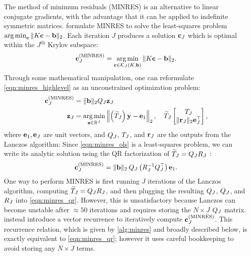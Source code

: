 The method of minimum residuals (MINRES) \cite{paige1975solution} is an alternative to linear conjugate gradients, with the advantage that it can be applied to indefinite symmetric matrices.
\citet{paige1975solution} formulate MINRES to solve the least-squares problem $\operatorname*{arg\,min}_{\mathbf{c}} \Vert K \mathbf{c} - \mathbf{b} \Vert_2$.
Each iteration $J$ produces a solution $\mathbf{c}_J$ which is optimal within the $J^\text{th}$ Krylov subspace:
%
\begin{equation}
	\mathbf{c}_J^{(\text{MINRES})} = \operatorname*{arg\,min}_{\mathbf{c} \in \mathcal{K}_J(K, \mathbf{b})} \Vert K \mathbf{c} - \mathbf{b} \Vert_2.
	\label{eqn:minres_highlevel}
\end{equation}
%
Through some mathematical manipulation, one can reformulate \cref{eqn:minres_highlevel} as an unconstrained optimization problem:
%
\begin{align}
  \mathbf{c}_J^{(\text{MINRES})} &= \Vert \mathbf{b} \Vert_2 Q_J \mathbf{z}_J
  \nonumber
  \\
  \mathbf{z}_J &= \operatorname*{arg\,min}_{\mathbf{z} \in \mathbb{R}^J} \left\Vert
		\left( \widetilde {T}_J \right)\mathbf{y} - \mathbf{e}_1
	\right\Vert_2,
	\quad
  \widetilde {T}_J \begin{bmatrix} T_J \\ \Vert \mathbf{r}_J \Vert_2 \mathbf{e}_J^\top  \end{bmatrix},
  \label{eqn:minres_ols}
\end{align}
%
where $\mathbf{e}_1, \mathbf{e}_J$ are unit vectors, and $Q_J$, $T_J$, and $\mathbf{r}_J$ are the outputs from the Lanczos algorithm:
Since \cref{eqn:minres_ols} is a least-squares problem, we can write its analytic solution using the QR factorization of $ \widetilde {T}_J = Q_J R_J$ \citep[e.g.][]{golub2012matrix}:
%
\begin{align}
  \mathbf{c}_J^{(\text{MINRES})} = \Vert \mathbf{b} \Vert_2 \: Q_J \left( R_J^{-1} Q_J^\top \right) \mathbf{e}_1.
	\label{eqn:minres_qr}
\end{align}
%
One way to perform MINRES is first running $J$ iterations of the Lanczos algorithm, computing $\widetilde {T}_J = Q_J R_J$, and then plugging the resulting $Q_J$, $Q_J$, and $R_J$ into \cref{eqn:minres_qr}.
However, this is unsatisfactory because Lanczos can become unstable after $\approx 50$ iterations and requires storing the $N \times J$ $Q_J$ matrix.
\citeauthor{paige1975solution} instead introduce a vector recurrence to iteratively compute $\mathbf{c}_J^\text{(MINRES)}$.
This recurrence relation, which is given by \cref{alg:minres} and broadly described below, is exactly equivalent to \cref{eqn:minres_qr}; however it uses careful bookkeeping to avoid storing any $N \times J$ terms.

